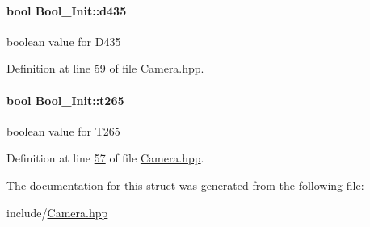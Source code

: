 \paragraph[{\texorpdfstring{d435}{d435}}]{\setlength{\rightskip}{0pt plus 5cm}bool Bool\+\_\+\+Init\+::d435}\hypertarget{structBool__Init_a9b59846a335953ae88cad02cd9cf9b34}{}\label{structBool__Init_a9b59846a335953ae88cad02cd9cf9b34}


boolean value for D435 



Definition at line \hyperlink{Camera_8hpp_source_l00059}{59} of file \hyperlink{Camera_8hpp_source}{Camera.\+hpp}.

\paragraph[{\texorpdfstring{t265}{t265}}]{\setlength{\rightskip}{0pt plus 5cm}bool Bool\+\_\+\+Init\+::t265}\hypertarget{structBool__Init_a28c7d578113b5a52c1706c10be8fe6c6}{}\label{structBool__Init_a28c7d578113b5a52c1706c10be8fe6c6}


boolean value for T265 



Definition at line \hyperlink{Camera_8hpp_source_l00057}{57} of file \hyperlink{Camera_8hpp_source}{Camera.\+hpp}.



The documentation for this struct was generated from the following file\+:\begin{DoxyCompactItemize}
\item 
include/\hyperlink{Camera_8hpp}{Camera.\+hpp}\end{DoxyCompactItemize}

